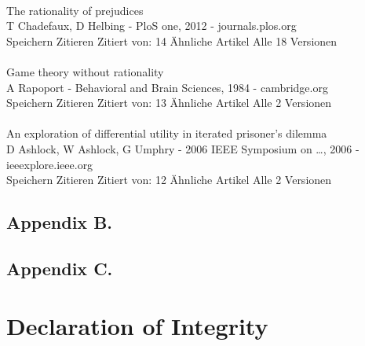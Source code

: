 \documentclass[11pt]{article}
\begin{document}
\\
\noindent 
The rationality of prejudices\\
T Chadefaux, D Helbing - PloS one, 2012 - journals.plos.org\\
Speichern Zitieren Zitiert von: 14 Ähnliche Artikel Alle 18 Versionen\\
\\
\noindent 
Game theory without rationality\\
A Rapoport - Behavioral and Brain Sciences, 1984 - cambridge.org\\
Speichern Zitieren Zitiert von: 13 Ähnliche Artikel Alle 2 Versionen\\
\\
\noindent 
An exploration of differential utility in iterated prisoner's dilemma\\
D Ashlock, W Ashlock, G Umphry - 2006 IEEE Symposium on …, 2006 - ieeexplore.ieee.org\\
Speichern Zitieren Zitiert von: 12 Ähnliche Artikel Alle 2 Versionen\\

\newpage

\subsection{Appendix B.}


\subsection{Appendix C.}
	
\section{Declaration of Integrity} \label{sec:declaration_of_integrity}
\end{document}
